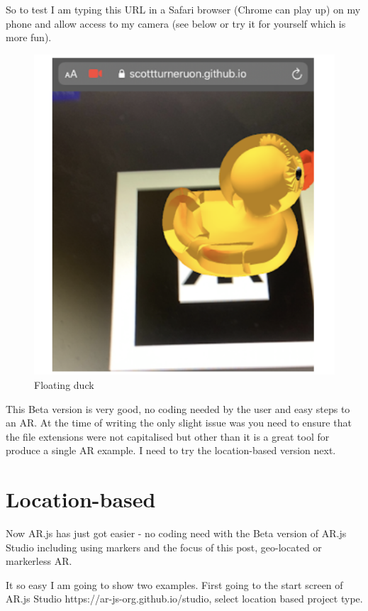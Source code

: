 So to test I am typing this URL in a Safari browser (Chrome can play up) on my phone and allow access to my camera (see below or try it for yourself which is more fun).

\begin{figure}
    \centering
    \includegraphics{chapters/ChapterAR/webar7.png}
    \caption{Floating duck}
    \label{fig:floatingduck}
\end{figure}

This Beta version is very good, no coding needed by the user and easy steps to an AR.  At the time of writing the only slight issue was you need to ensure that the file extensions were not capitalised but other than it is a great tool for produce a single AR example. I need to try the location-based version next.



\section{Location-based}
 Now AR.js has just got easier - no coding need with the Beta version of AR.js Studio  including using markers and the focus of this post, geo-located or markerless AR.
 
 It so easy I am going to show two examples. First going to the start screen of AR.js Studio https://ar-js-org.github.io/studio, select location based project type.
 
